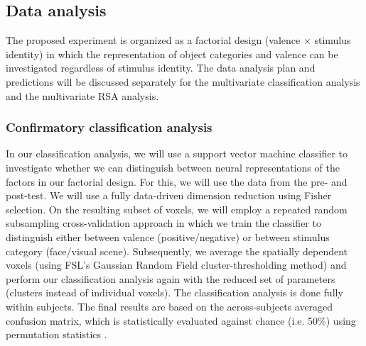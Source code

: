 \documentclass[12pt,a4paper]{article}\usepackage[]{graphicx}\usepackage[]{color}
\begin{document}
\subsection{Data analysis}
The proposed experiment is organized as a factorial design (valence $\times$ stimulus identity) in which the representation of object categories and valence can be investigated regardless of stimulus identity. The data analysis plan and predictions will be discussed separately for the multivariate classification analysis and the multivariate RSA analysis.

\subsubsection{Confirmatory classification analysis}
In our classification analysis, we will use a support vector machine classifier to investigate whether we can distinguish between neural representations of the factors in our factorial design. For this, we will use the data from the pre- and post-test. We will use a fully data-driven dimension reduction using Fisher selection. On the resulting subset of voxels, we will employ a repeated random subsampling cross-validation approach in which we train the classifier to distinguish either between valence (positive/negative) or between stimulus category (face/visual scene). Subsequently, we average the spatially dependent voxels (using FSL's Gaussian Random Field cluster-thresholding method) and perform our classification analysis again with the reduced set of parameters (clusters instead of individual voxels). The classification analysis is done fully within subjects. The final results are based on the across-subjects averaged confusion matrix, which is statistically evaluated against chance (i.e. 50\%) using permutation statistics \citep{nichols2002}.     
\end{document}
